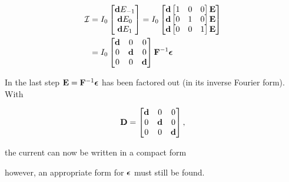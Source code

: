 \documentclass[12pt,journal,compsoc]{../ieeepaper/IEEEtran}
\begin{document}
\begin{equation}\label{eqn:ece1254projectReport:900}
\begin{aligned}
\mathcal{I} &= 
I_0
\begin{bmatrix}
\Bd E_{-1} \\
\Bd E_{0} \\
\Bd E_{1} \\
\end{bmatrix}
=
I_0
\begin{bmatrix}
\Bd \begin{bmatrix} 1 & 0 & 0 \end{bmatrix} \BE \\
\Bd \begin{bmatrix} 0 & 1 & 0 \end{bmatrix} \BE \\
\Bd \begin{bmatrix} 0 & 0 & 1 \end{bmatrix} \BE
\end{bmatrix} \\
&=
I_0
\begin{bmatrix}
\Bd & 0 & 0 \\
0 & \Bd & 0 \\
0 & 0 & \Bd 
\end{bmatrix}
\BF^{-1} \Bepsilon
\end{aligned}
\end{equation}

In the last step \( \mathbf{E} = \mathbf{F}^{-1} \boldsymbol{\epsilon} \) has been factored out (in its inverse Fourier form).  With

\begin{dmath}\label{eqn:ece1254projectReport:920}
\BD =
\begin{bmatrix}
\Bd & 0 & 0 \\
0 & \Bd & 0 \\
0 & 0   & \Bd \\
\end{bmatrix},
\end{dmath}

the current can now be written in a compact form


however, an appropriate form for \( \boldsymbol{\epsilon} \) must still be found.
\end{document}

